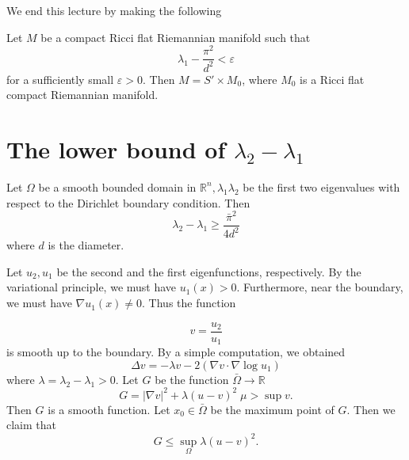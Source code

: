 We end this lecture by making the following
\\

\begin{conjecture}
Let $M$ be a compact Ricci flat Riemannian manifold such that
\[
\lambda_1 - \frac{\pi^2}{d^2} < \varepsilon
\]
for a sufficiently small $\varepsilon > 0$. Then $M = S' \times M_0$, where 
$M_0$ is a Ricci flat compact Riemannian manifold.
\end{conjecture}






\section{The lower bound of $ \lambda_2 - \lambda _1$}

Let $ \Omega $ be a smooth bounded domain in $ \mathbb{R}^n , \lambda _1 \lambda _2 $ be the first two eigenvalues with respect to the Dirichlet boundary condition. Then 
%
\[ \lambda _2 - \lambda _1 \geq \frac{\bar{\pi}^2}{4 d ^2} \]
%
where $ d $ is the diameter.

 Let $ u_2, u_1 $ be the second and the first eigenfunctions, respectively. By the variational principle, we must have $ u_1 (x) > 0 $. Furthermore, near the boundary, we must have $ \nabla u_1 (x) \neq 0 $. Thus the function


\[ v = \frac{u_2}{u_1} \]
%
is smooth up to the boundary. By a simple computation, we obtained 
%
\[ \Delta v = - \lambda v - 2 ( \nabla v \cdot \nabla \log u_1) \]
%
where $ \lambda = \lambda _2 - \lambda _1 > 0 $. Let $ G$ be the function $ \bar{\Omega} \rightarrow \mathbb{R}$
%
\[G = |\nabla v | ^2 + \lambda (u - v ) ^2 \; \mu > \sup v. \]
%
Then $ G$ is a smooth function. Let $ x_0 \in \bar{\Omega} $ be the maximum point of $G$. Then we claim that 
%
\[ G \leq \sup_{\Omega} \lambda ( u - v )^2 .\]

